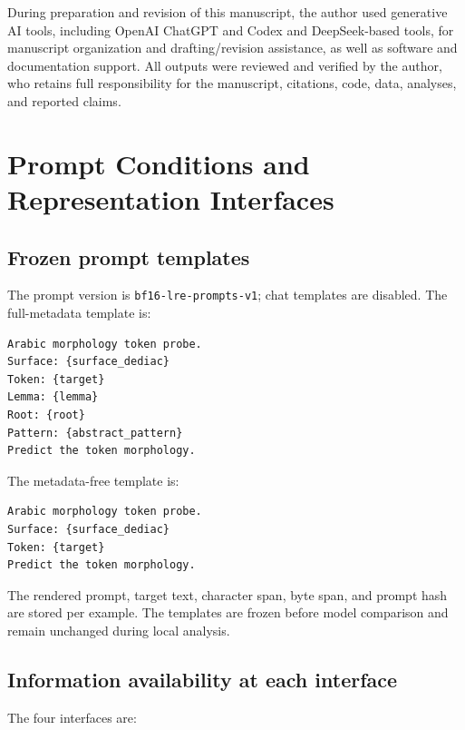 \documentclass[pdflatex,sn-basic]{sn-jnl}
\begin{document}
During preparation and revision of this manuscript, the author used generative
AI tools, including OpenAI ChatGPT and Codex and DeepSeek-based tools, for
manuscript organization and drafting/revision assistance, as well as software
and documentation support. All outputs were reviewed and verified by the
author, who retains full responsibility for the manuscript, citations, code,
data, analyses, and reported claims.

\section{Prompt Conditions and Representation Interfaces}

\subsection{Frozen prompt templates}

The prompt version is \texttt{bf16-lre-prompts-v1}; chat templates are
disabled. The full-metadata template is:

\begin{verbatim}
Arabic morphology token probe.
Surface: {surface_dediac}
Token: {target}
Lemma: {lemma}
Root: {root}
Pattern: {abstract_pattern}
Predict the token morphology.
\end{verbatim}

The metadata-free template is:

\begin{verbatim}
Arabic morphology token probe.
Surface: {surface_dediac}
Token: {target}
Predict the token morphology.
\end{verbatim}

The rendered prompt, target text, character span, byte span, and prompt hash
are stored per example. The templates are frozen before model comparison and
remain unchanged during local analysis.

\subsection{Information availability at each interface}

The four interfaces are:
\end{document}
